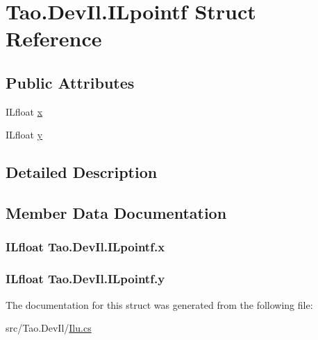\hypertarget{struct_tao_1_1_dev_il_1_1_i_lpointf}{
\section{Tao.DevIl.ILpointf Struct Reference}
\label{struct_tao_1_1_dev_il_1_1_i_lpointf}
}
\subsection*{Public Attributes}
\begin{DoxyCompactItemize}
\item 
ILfloat \hyperlink{struct_tao_1_1_dev_il_1_1_i_lpointf_ae1a4c99f2a07b9e0f30d0f77eb331f54}{x}
\item 
ILfloat \hyperlink{struct_tao_1_1_dev_il_1_1_i_lpointf_ad5314043d5e4e1af009c065a7895072e}{y}
\end{DoxyCompactItemize}


\subsection{Detailed Description}


\subsection{Member Data Documentation}
\hypertarget{struct_tao_1_1_dev_il_1_1_i_lpointf_ae1a4c99f2a07b9e0f30d0f77eb331f54}{
\subsubsection[{x}]{\setlength{\rightskip}{0pt plus 5cm}ILfloat {\bf Tao.DevIl.ILpointf.x}}}
\label{struct_tao_1_1_dev_il_1_1_i_lpointf_ae1a4c99f2a07b9e0f30d0f77eb331f54}
\hypertarget{struct_tao_1_1_dev_il_1_1_i_lpointf_ad5314043d5e4e1af009c065a7895072e}{
\subsubsection[{y}]{\setlength{\rightskip}{0pt plus 5cm}ILfloat {\bf Tao.DevIl.ILpointf.y}}}
\label{struct_tao_1_1_dev_il_1_1_i_lpointf_ad5314043d5e4e1af009c065a7895072e}


The documentation for this struct was generated from the following file:\begin{DoxyCompactItemize}
\item 
src/Tao.DevIl/\hyperlink{_ilu_8cs}{Ilu.cs}\end{DoxyCompactItemize}
